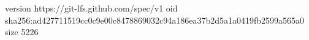 version https://git-lfs.github.com/spec/v1
oid sha256:ad427711519cc0c9e00c8478869032c94a186ea37b2d5a1a0419fb2599a565a0
size 5226
